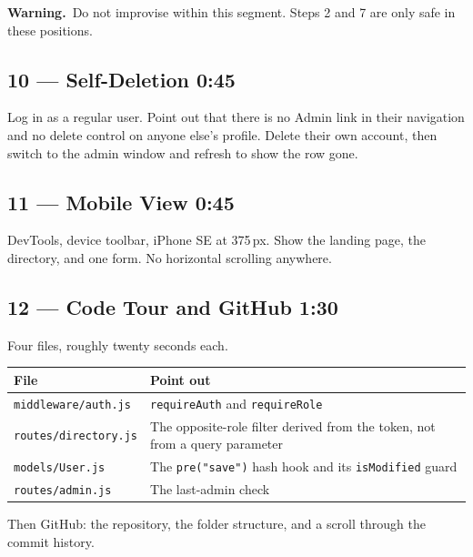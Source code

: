 \documentclass[11pt,letterpaper]{article}
\newcommand{\warnbox}[1]{%
  \begin{mdframed}[linecolor=glwarn,linewidth=1pt,
                   innertopmargin=6pt,innerbottommargin=6pt,
                   innerleftmargin=8pt,innerrightmargin=8pt,
                   skipabove=8pt,skipbelow=8pt]
  \textbf{\color{glwarn}Warning.}\ #1
  \end{mdframed}}
\begin{document}
\warnbox{Do not improvise within this segment. Steps 2 and 7 are only safe
in these positions.}

\subsection*{10 --- Self-Deletion \hfill \normalfont\small 0:45}

Log in as a regular user. Point out that there is no Admin link in their
navigation and no delete control on anyone else's profile. Delete their own
account, then switch to the admin window and refresh to show the row gone.

\subsection*{11 --- Mobile View \hfill \normalfont\small 0:45}

DevTools, device toolbar, iPhone SE at 375\,px. Show the landing page, the
directory, and one form. No horizontal scrolling anywhere.

\subsection*{12 --- Code Tour and GitHub \hfill \normalfont\small 1:30}

Four files, roughly twenty seconds each.

\begin{center}
\begin{tabularx}{\textwidth}{@{}L{4.6cm} X@{}}
\toprule
\textbf{File} & \textbf{Point out}\\
\midrule
\texttt{middleware/auth.js} & \texttt{requireAuth} and \texttt{requireRole}\\
\texttt{routes/directory.js} & The opposite-role filter derived from the
token, not from a query parameter\\
\texttt{models/User.js} & The \texttt{pre("save")} hash hook and its
\texttt{isModified} guard\\
\texttt{routes/admin.js} & The last-admin check\\
\bottomrule
\end{tabularx}
\end{center}

Then GitHub: the repository, the folder structure, and a scroll through the
commit history.
\end{document}
